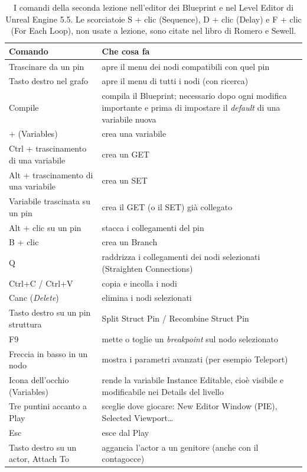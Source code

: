 \begin{table}[htbp]
\centering
\small
\begin{tabular}{@{}p{4.6cm}p{8.4cm}@{}}
\toprule
\textbf{Comando} & \textbf{Che cosa fa} \\
\midrule
Trascinare da un pin & apre il menu dei nodi compatibili con quel pin \\
Tasto destro nel grafo & apre il menu di tutti i nodi (con ricerca) \\
Compile & compila il Blueprint; necessario dopo ogni modifica importante e prima di
  impostare il \emph{default} di una variabile nuova \\
+ (Variables) & crea una variabile \\
Ctrl + trascinamento di una variabile & crea un GET \\
Alt + trascinamento di una variabile & crea un SET \\
Variabile trascinata su un pin & crea il GET (o il SET) già collegato \\
Alt + clic su un pin & stacca i collegamenti del pin \\
B + clic & crea un Branch \\
Q & raddrizza i collegamenti dei nodi selezionati (Straighten Connections) \\
Ctrl+C / Ctrl+V & copia e incolla i nodi \\
Canc (\emph{Delete}) & elimina i nodi selezionati \\
Tasto destro su un pin struttura & Split Struct Pin / Recombine Struct Pin \\
F9 & mette o toglie un \emph{breakpoint} sul nodo selezionato \\
Freccia in basso in un nodo & mostra i parametri avanzati (per esempio Teleport) \\
Icona dell'occhio (Variables) & rende la variabile Instance Editable, cioè visibile e
  modificabile nei Details del livello \\
Tre puntini accanto a Play & sceglie dove giocare: New Editor Window (PIE), Selected
  Viewport\ldots \\
Esc & esce dal Play \\
Tasto destro su un actor, Attach To & aggancia l'actor a un genitore (anche con il
  contagocce) \\
\bottomrule
\end{tabular}
\caption{I comandi della seconda lezione nell'editor dei Blueprint e nel Level Editor di
Unreal Engine 5.5. Le scorciatoie S + clic (Sequence), D + clic (Delay) e F + clic (For
Each Loop), non usate a lezione, sono citate nel libro di Romero e Sewell.}
\label{ue2:tab:scorciatoie}
\end{table}

